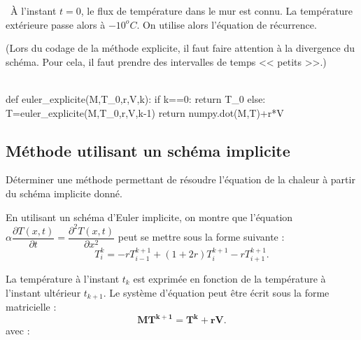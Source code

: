 \begin{corrige}
\question\
\`A l'instant $t=0$, le flux de température dans le mur est connu. La température extérieure passe alors à $-10^o C$. On 
utilise alors l'équation de récurrence.

(Lors du codage de la méthode explicite, il faut faire attention à la divergence du schéma. Pour cela, il faut prendre 
des intervalles de temps << petits >>.)\\

\question\
\begin{python}
def euler_explicite(M,T_0,r,V,k):
    if k==0:
        return T_0
    else:
        T=euler_explicite(M,T_0,r,V,k-1)
        return numpy.dot(M,T)+r*V
        
\end{python}
\end{corrige}
\else
\fi




\subsection{Méthode utilisant un schéma implicite}

\ifprof
\else
\begin{obj}
Déterminer une méthode permettant de résoudre l'équation de la chaleur à partir du 
schéma implicite donné.
\end{obj}

En utilisant un schéma d'Euler implicite, on montre que l'équation 
$\alpha \dfrac{\partial T(x,t)}{\partial t} = \dfrac{\partial^2 T(x,t)}{\partial x^2}$
 peut se mettre sous la forme suivante : 
$$
T_i^k = -rT_{i-1}^{k+1} + \left( 1+2r\right) T_{i}^{k+1}-rT_{i+1}^{k+1}.
$$

La température à l'instant $t_k$ est exprimée en fonction de la température à l'instant 
ultérieur $t_{k+1}$.
Le système d'équation peut être écrit sous la forme matricielle : 
\begin{equation} \label{eq_implicite}
\mathbf{M T^{k+1} = T^k + rV}.
\end{equation}
avec : 

